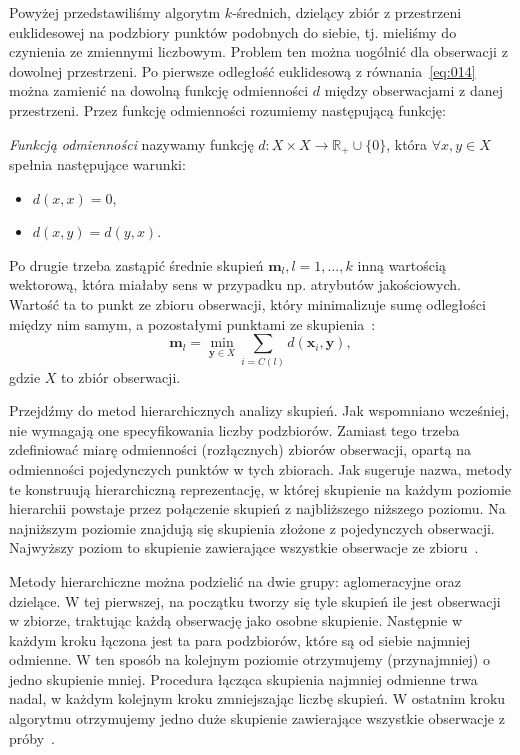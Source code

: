 \documentclass{praca1}
\begin{document}
Powyżej przedstawiliśmy algorytm $k$-średnich, dzielący zbiór z przestrzeni euklidesowej na podzbiory punktów podobnych do siebie, tj. mieliśmy do czynienia ze zmiennymi liczbowym. Problem ten można uogólnić dla obserwacji z dowolnej przestrzeni. Po pierwsze odległość euklidesową z równania~\eqref{eq:014} można zamienić na dowolną funkcję odmienności $d$ między obserwacjami z danej przestrzeni. Przez funkcję odmienności rozumiemy następującą funkcję:

\begin{definition}
\emph{Funkcją odmienności} nazywamy funkcję $d: X\times X \rightarrow \mathbb{R}_+\cup\{0\}$, która \hbox{$\forall x, y \in X$} spełnia następujące warunki:
\begin{itemize}
\item $d(x,x) = 0$,
\item $d(x,y) = d(y,x)$.
\end{itemize}
\end{definition}

Po drugie trzeba zastąpić średnie skupień $\mathbf{m}_l, l=1,\ldots,k$ inną wartością wektorową, która miałaby sens w przypadku np. atrybutów jakościowych. Wartość ta to punkt ze zbioru obserwacji, który minimalizuje sumę odległości między nim samym, a pozostałymi punktami ze skupienia~\cite{Koronacki2005:statystyczne}:
\begin{equation}
\mathbf{m}_l = \min\limits_{\mathbf{y} \in X} \sum\limits_{i = C(l)} d(\mathbf{x}_i, \mathbf{y}),
\end{equation}
gdzie $X$ to zbiór obserwacji.

Przejdźmy do metod hierarchicznych analizy skupień. Jak wspomniano wcześniej, nie wymagają one specyfikowania liczby podzbiorów. Zamiast tego trzeba zdefiniować miarę odmienności (rozłącznych) zbiorów obserwacji, opartą na odmienności pojedynczych punktów w tych zbiorach. Jak sugeruje nazwa, metody te konstruują hierarchiczną reprezentację, w której skupienie na każdym poziomie hierarchii powstaje przez połączenie skupień z najbliższego niższego poziomu. Na najniższym poziomie znajdują się skupienia złożone z pojedynczych obserwacji. Najwyższy poziom to skupienie zawierające wszystkie obserwacje ze zbioru~\cite{Hastie2009:elements}.

Metody hierarchiczne można podzielić na dwie grupy: aglomeracyjne oraz dzielące. W tej pierwszej, na początku tworzy się tyle skupień ile jest obserwacji w zbiorze, traktując każdą obserwację jako osobne skupienie. Następnie w każdym kroku łączona jest ta para podzbiorów, które są od siebie najmniej odmienne. W ten sposób na kolejnym poziomie otrzymujemy (przynajmniej) o jedno skupienie mniej. Procedura łącząca skupienia najmniej odmienne trwa nadal, w każdym kolejnym kroku zmniejszając liczbę skupień. W ostatnim kroku algorytmu otrzymujemy jedno duże skupienie zawierające wszystkie obserwacje z próby~\cite{Hastie2009:elements, Koronacki2005:statystyczne}.
\end{document}
